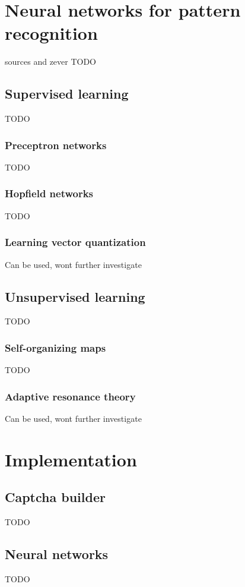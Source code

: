 \documentclass[pdftex,a4paper,12pt,twoside]{report}
\theoremstyle{plain} \newtheorem{theorem}{Theorem} \newtheorem{proposition}{Proposition} \newtheorem{lemma}{Lemma} \newtheorem*{corollary}{Corollary}
\theoremstyle{definition} \newtheorem{definition}{Definition} \newtheorem{conjecture}{Conjecture} \newtheorem*{example}{Example} \newtheorem{algorithm}{Algorithm}
\theoremstyle{remark} \newtheorem*{remark}{Remark} \newtheorem*{note}{Note} \newtheorem{case}{Case}
\begin{document}
\section{Neural networks for pattern recognition}
sources and zever
TODO
\subsection{Supervised learning}
TODO
\subsubsection{Preceptron networks}
TODO
\subsubsection{Hopfield networks}
TODO
\subsubsection{Learning vector quantization}
Can be used, wont further investigate
\subsection{Unsupervised learning}
TODO
\subsubsection{Self-organizing maps}
TODO
\subsubsection{Adaptive resonance theory}
Can be used, wont further investigate
\section{Implementation}
\label{sec:implementation}
\subsection{Captcha builder}
TODO
\subsection{Neural networks}
TODO
\end{document}
